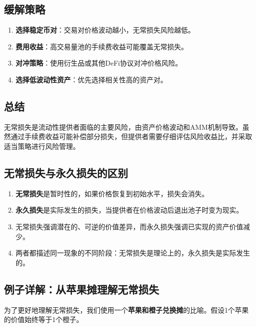 \documentclass[12pt]{ctexart}
\begin{document}
\subsection{缓解策略}
\begin{enumerate}
    \item \textbf{选择稳定币对}：交易对价格波动越小，无常损失风险越低。
    \item \textbf{费用收益}：高交易量池的手续费收益可能覆盖无常损失。
    \item \textbf{对冲策略}：使用衍生品或其他DeFi协议对冲价格风险。
    \item \textbf{选择低波动性资产}：优先选择相关性高的资产对。
\end{enumerate}

\subsection{总结}
无常损失是流动性提供者面临的主要风险，由资产价格波动和AMM机制导致。虽然通过手续费收益可能补偿部分损失，但提供者需要仔细评估风险收益比，并采取适当策略进行风险管理。

\subsection{无常损失与永久损失的区别}
\begin{enumerate}
    \item \textbf{无常损失}是暂时性的，如果价格恢复到初始水平，损失会消失。
    \item \textbf{永久损失}是实际发生的损失，当提供者在价格波动后退出池子时变为现实。
    \item 无常损失强调潜在的、可逆的价值差异，而永久损失强调已实现的资产价值减少。
    \item 两者都描述同一现象的不同阶段：无常损失是理论上的，永久损失是实际发生的。
\end{enumerate}

\subsection{例子详解：从苹果摊理解无常损失}
为了更好地理解无常损失，我们使用一个\textbf{苹果和橙子兑换摊}的比喻。假设1个苹果的价值始终等于1个橙子。
\end{document}

